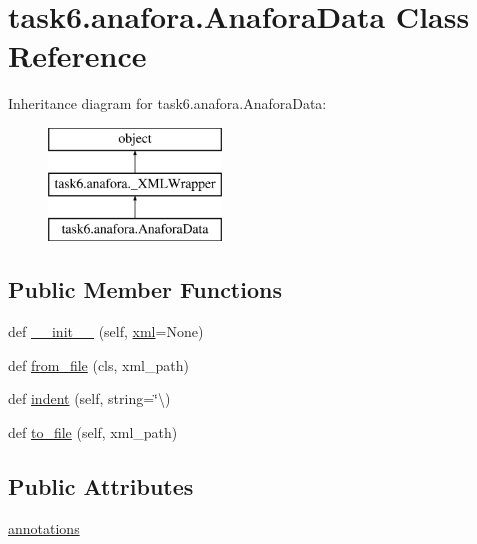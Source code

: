 \hypertarget{classtask6_1_1anafora_1_1AnaforaData}{}\section{task6.\+anafora.\+Anafora\+Data Class Reference}
\label{classtask6_1_1anafora_1_1AnaforaData}
Inheritance diagram for task6.\+anafora.\+Anafora\+Data\+:\begin{figure}[H]
\begin{center}
\leavevmode
\includegraphics[height=3.000000cm]{classtask6_1_1anafora_1_1AnaforaData}
\end{center}
\end{figure}
\subsection*{Public Member Functions}
\begin{DoxyCompactItemize}
\item 
def \hyperlink{classtask6_1_1anafora_1_1AnaforaData_a2f6cf540b48d4319d08d3e8d2b832b42}{\+\_\+\+\_\+init\+\_\+\+\_\+} (self, \hyperlink{classtask6_1_1anafora_1_1__XMLWrapper_abed00085815402c05f9569d349f8dfda}{xml}=None)
\item 
def \hyperlink{classtask6_1_1anafora_1_1AnaforaData_a56eaf8ae37770b37cf08c7ae12b07ca9}{from\+\_\+file} (cls, xml\+\_\+path)
\item 
def \hyperlink{classtask6_1_1anafora_1_1AnaforaData_a4c40961dcb466e5682f17264cbaab14d}{indent} (self, string=\char`\"{}\textbackslash{})
\item 
def \hyperlink{classtask6_1_1anafora_1_1AnaforaData_a0751021cf066fd7c9e1d993668f2f46f}{to\+\_\+file} (self, xml\+\_\+path)
\end{DoxyCompactItemize}
\subsection*{Public Attributes}
\begin{DoxyCompactItemize}
\item 
\hyperlink{classtask6_1_1anafora_1_1AnaforaData_ac3e72119a3bab4ee104383ff39944884}{annotations}
\end{DoxyCompactItemize}


